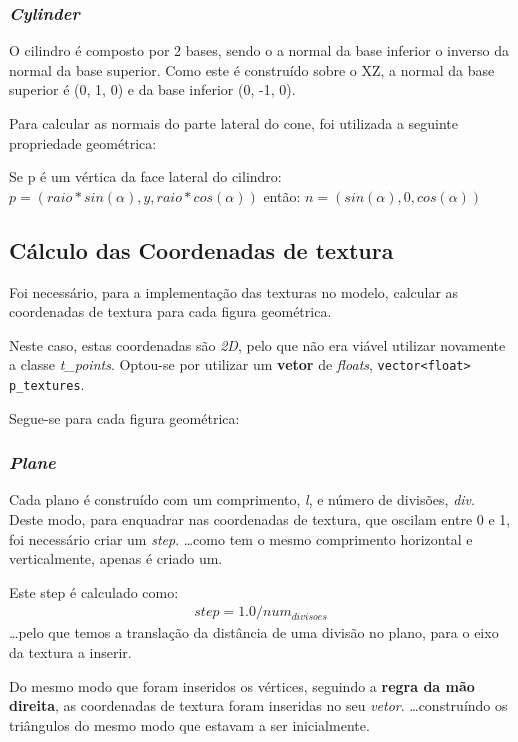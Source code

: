 \documentclass[relatorio.tex]{subfiles}
\begin{document}
\subsubsection{\textit{Cylinder}}
O cilindro é composto por 2 bases, sendo o a normal da base inferior o inverso
da normal da base superior. Como este é construído sobre o XZ, a normal da base superior
é (0, 1, 0) e da base inferior (0, -1, 0).

Para calcular as normais do parte lateral do cone, foi utilizada a seguinte propriedade
geométrica:

Se p é um vértica da face lateral do cilindro:
$ p = (raio * sin(\alpha), y, raio * cos(\alpha))$
então:
$ n = (sin(\alpha), 0, cos(\alpha))$


\subsection{Cálculo das Coordenadas de textura} \label{subsec:texCoord}
Foi necessário, para a implementação das texturas no modelo,
calcular as coordenadas de textura para cada figura geométrica.

Neste caso, estas coordenadas são \textit{2D}, pelo que
não era viável utilizar novamente a classe \textit{t\_points}.
Optou-se por utilizar um \textbf{vetor} de \textit{floats},
\texttt{vector<float> p_textures}.

Segue-se para cada figura geométrica:
\subsubsection{\textit{Plane}}

Cada plano é construído com um comprimento, \textit{l}, 
e número de divisões, \textit{div}.
Deste modo, para enquadrar nas coordenadas de textura,
que oscilam entre 0 e 1, foi necessário criar 
um \textit{step}.
\dots como tem o mesmo comprimento horizontal e 
verticalmente, apenas é criado um.

Este step é calculado como:
\begin{eqnarray}
    step = 1.0 / num_{divisoes}
\end{eqnarray}
\dots pelo que temos a translação da distância de uma
divisão no plano, para o eixo da textura a inserir.

Do mesmo modo que foram inseridos os vértices,
seguindo a \textbf{regra da mão direita}, 
as coordenadas de textura foram inseridas no seu \textit{vetor}.
\dots construíndo os triângulos do mesmo 
modo que estavam a ser inicialmente.
\end{document}
